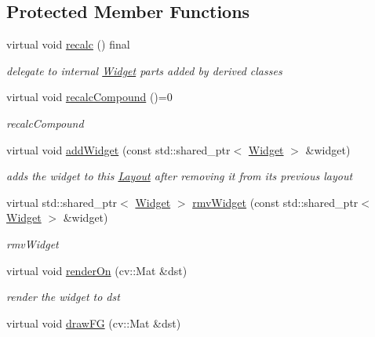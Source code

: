\subsection*{Protected Member Functions}
\begin{DoxyCompactItemize}
\item 
virtual void \hyperlink{classcanvascv_1_1CompoundWidget_aac9694f4fbc3e31d3b5d37df4a25a753}{recalc} () final\hypertarget{classcanvascv_1_1CompoundWidget_aac9694f4fbc3e31d3b5d37df4a25a753}{}\label{classcanvascv_1_1CompoundWidget_aac9694f4fbc3e31d3b5d37df4a25a753}

\begin{DoxyCompactList}\small\item\em delegate to internal \hyperlink{classcanvascv_1_1Widget}{Widget} parts added by derived classes \end{DoxyCompactList}\item 
virtual void \hyperlink{classcanvascv_1_1CompoundWidget_a4a4f8241d6fd187ffcae2c7968f13864}{recalc\+Compound} ()=0
\begin{DoxyCompactList}\small\item\em recalc\+Compound \end{DoxyCompactList}\item 
virtual void \hyperlink{classcanvascv_1_1CompoundWidget_aea537ebb4b6988a052dea60c1ab7772e}{add\+Widget} (const std\+::shared\+\_\+ptr$<$ \hyperlink{classcanvascv_1_1Widget}{Widget} $>$ \&widget)\hypertarget{classcanvascv_1_1CompoundWidget_aea537ebb4b6988a052dea60c1ab7772e}{}\label{classcanvascv_1_1CompoundWidget_aea537ebb4b6988a052dea60c1ab7772e}

\begin{DoxyCompactList}\small\item\em adds the widget to this \hyperlink{classcanvascv_1_1Layout}{Layout} after removing it from it\textquotesingle{}s previous layout \end{DoxyCompactList}\item 
virtual std\+::shared\+\_\+ptr$<$ \hyperlink{classcanvascv_1_1Widget}{Widget} $>$ \hyperlink{classcanvascv_1_1CompoundWidget_ad4a37bf31f9cf6410b41526a5b83c75a}{rmv\+Widget} (const std\+::shared\+\_\+ptr$<$ \hyperlink{classcanvascv_1_1Widget}{Widget} $>$ \&widget)
\begin{DoxyCompactList}\small\item\em rmv\+Widget \end{DoxyCompactList}\item 
virtual void \hyperlink{classcanvascv_1_1CompoundWidget_a1ceebdcae41eadc0796306ca88698411}{render\+On} (cv\+::\+Mat \&dst)
\begin{DoxyCompactList}\small\item\em render the widget to dst \end{DoxyCompactList}\item 
virtual void \hyperlink{classcanvascv_1_1CompoundWidget_a2cabb8158780247ddc9f2b7bc3db49ca}{draw\+FG} (cv\+::\+Mat \&dst)\hypertarget{classcanvascv_1_1CompoundWidget_a2cabb8158780247ddc9f2b7bc3db49ca}{}\label{classcanvascv_1_1CompoundWidget_a2cabb8158780247ddc9f2b7bc3db49ca}


\end{DoxyCompactItemize}
